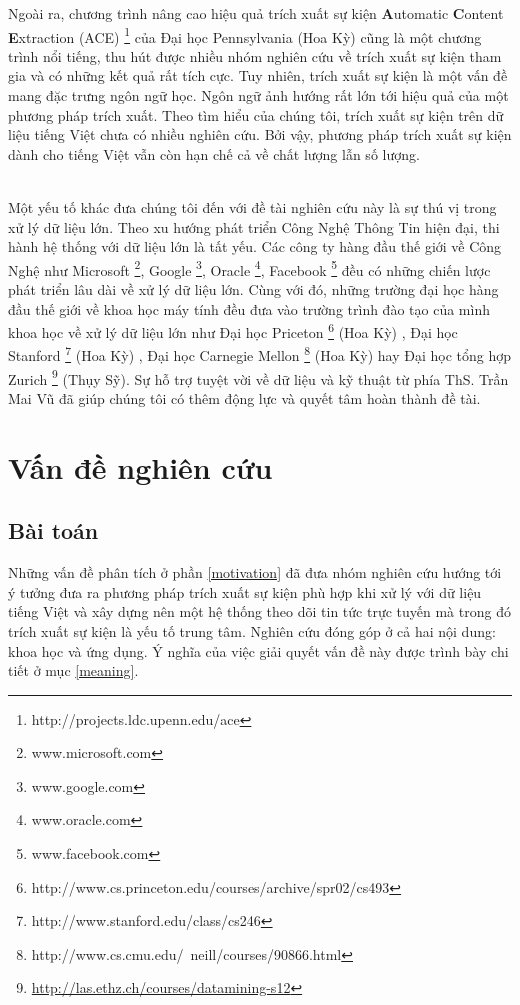 Ngoài ra, chương trình nâng cao hiệu quả trích xuất sự kiện \textbf{A}utomatic \textbf{C}ontent \textbf{E}xtraction (ACE) \footnote{http://projects.ldc.upenn.edu/ace} của Đại học Pennsylvania (Hoa Kỳ) cũng là một chương trình nổi tiếng, thu hút được nhiều nhóm nghiên cứu về trích xuất sự kiện tham gia và có những kết quả rất tích cực. Tuy nhiên, trích xuất sự kiện là một vấn đề mang đặc trưng ngôn ngữ học. Ngôn ngữ ảnh hướng rất lớn tới hiệu quả của một phương pháp trích xuất. Theo tìm hiểu của chúng tôi, trích xuất sự kiện trên dữ liệu tiếng Việt chưa có nhiều nghiên cứu. Bởi vậy, phương pháp trích xuất sự kiện dành cho tiếng Việt vẫn còn hạn chế cả về chất lượng lẫn số lượng.

\\
\noindent Một yếu tố khác đưa chúng tôi đến với đề tài nghiên cứu này là sự thú vị trong xử lý dữ liệu lớn. Theo xu hướng phát triển Công Nghệ Thông Tin hiện đại, thi hành hệ thống với dữ liệu lớn là tất yếu. Các công ty hàng đầu thế giới về Công Nghệ như Microsoft \footnote{www.microsoft.com}, Google \footnote{www.google.com}, Oracle \footnote{www.oracle.com}, Facebook \footnote{www.facebook.com} đều có những chiến lược phát triển lâu dài về xử lý dữ liệu lớn. Cùng với đó, những trường đại học hàng đầu thế giới về khoa học máy tính đều đưa vào trường trình đào tạo của mình khoa học về xử lý dữ liệu lớn như Đại học Priceton \footnote{http://www.cs.princeton.edu/courses/archive/spr02/cs493} (Hoa Kỳ) , Đại học Stanford \footnote{http://www.stanford.edu/class/cs246} (Hoa Kỳ) , Đại học Carnegie Mellon \footnote{http://www.cs.cmu.edu/~neill/courses/90866.html} (Hoa Kỳ) hay Đại học tổng hợp Zurich \footnote{\href{http://las.ethz.ch/courses/datamining-s12}{http://las.ethz.ch/courses/datamining-s12}} (Thụy Sỹ). Sự hỗ trợ tuyệt vời về dữ liệu và kỹ thuật  từ phía ThS. Trần Mai Vũ đã giúp chúng tôi có thêm động lực và quyết tâm hoàn thành đề tài.



\section{Vấn đề nghiên cứu}
\label{problem}
    \subsection{Bài toán}
    \noindent Những vấn đề phân tích ở phần \ref{motivation} đã đưa nhóm nghiên cứu hướng tới ý tưởng đưa ra phương pháp trích xuất sự kiện phù hợp khi xử lý với dữ liệu tiếng Việt và xây dựng nên một hệ thống theo dõi tin tức trực tuyến mà trong đó trích xuất sự kiện là yếu tố trung tâm. Nghiên cứu đóng góp ở cả hai nội dung: khoa học và ứng dụng. Ý nghĩa của việc giải quyết vấn đề này được trình bày chi tiết ở mục \ref{meaning}.
